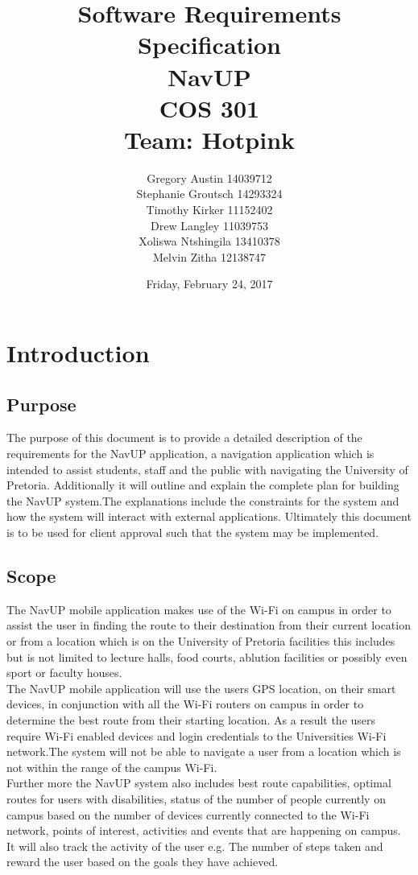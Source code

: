 \documentclass[11pt, a4paper]{article}
\title{Software Requirements Specification \\ NavUP \\ COS 301 \\ Team: Hotpink}
\date{Friday,  February 24,  2017}
\author{Gregory Austin 14039712 \\ Stephanie Groutsch 14293324 \\ Timothy Kirker 11152402 \\ Drew Langley 11039753 \\ Xoliswa Ntshingila 13410378
\\ Melvin Zitha 12138747}
\begin{document}
\maketitle
\newpage
\tableofcontents

\newpage
\section{Introduction}
	\subsection{Purpose}
	The purpose of this document is to provide a detailed description of the requirements for the NavUP application,  a navigation application which is intended to assist students,  staff and the  public with navigating the University of Pretoria. Additionally it will outline and explain the complete plan for building the NavUP system.The explanations include the constraints for the system and how the system will interact with external applications. Ultimately this document is to be used for client approval such that the system may be implemented.

	\subsection{Scope}

		The NavUP mobile application makes use of the Wi-Fi on campus in order to assist the user in finding the route to their destination from their current location or from a location which is on the University of Pretoria facilities this includes but is not limited to lecture halls,  food courts,  ablution facilities or possibly even sport or faculty houses. 
		\\
		The NavUP mobile application will use the users GPS location,  on their smart devices,  in conjunction with all the Wi-Fi routers on campus in order to determine the best route from their starting location. As a result the users require Wi-Fi enabled devices and login credentials to the Universities Wi-Fi network.The system will not be able to navigate a user from a location which is 			not within the range of the campus Wi-Fi.
		\\
 		Further more the  NavUP system also includes best route capabilities,  optimal routes for users with disabilities,  status of the number of people currently on campus based on the number of devices currently connected to the Wi-Fi network, points of interest,  activities and events that are happening on campus. It will also track the activity of the user e.g. The number of steps 				taken and reward the user based on the goals  they have achieved.
\end{document}
